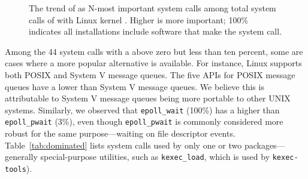 \begin{figure}[t]
\vspace{-0.1in}
\caption{The trend of \usagemetric{} as N-most important system calls among total \syscallnum{} system calls of \osversion{} with Linux kernel . 
Higher is more important; 100\% indicates all installations include software that make the system call.}
\label{fig:syscall-popularity-trend}
\end{figure}


Among the 44 system calls with a \usagemetric{} above zero but less than ten percent,
some are cases where a more popular alternative is available.
For instance, Linux supports both POSIX and System V message queues.
The five APIs for POSIX message queues have a lower
\usagemetric{} than System V message queues.
We believe this is attributable to System V message queues %
being more portable to other UNIX systems.
Similarly, we observed that {\tt epoll\_wait} (100\%) has a higher \usagemetric{} than {\tt epoll\_pwait} (3\%),
even though {\tt epoll\_pwait} is commonly considered more robust
for the same purpose---waiting on file descriptor events.
Table~\ref{tab:dominated} lists
system calls used by only one or two packages---generally special-purpose utilities,
such as {\tt kexec\_load}, which is used by {\tt kexec-tools}).

